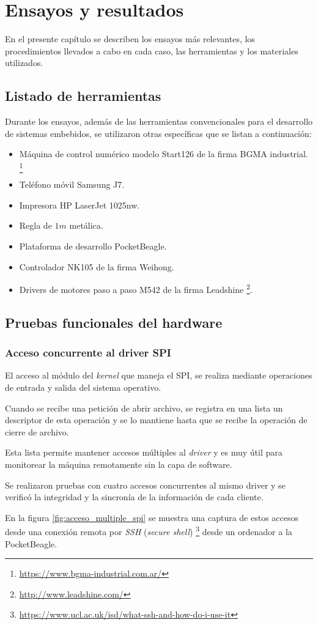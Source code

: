 \chapter{Ensayos y resultados} %
\label{Chapter4}

En el presente capítulo se describen los ensayos más relevantes, los procedimientos llevados a cabo en cada caso, las herramientas y los materiales utilizados.

\section{Listado de herramientas}

Durante los ensayos, además de las herramientas convencionales para el desarrollo de sistemas embebidos, se utilizaron otras específicas que se listan a continuación:
\begin{itemize}
   \item{Máquina de control numérico modelo Start126 de la firma BGMA industrial. \footnote{\url{https://www.bgma-industrial.com.ar/}}}
   \item{Teléfono móvil Samsung J7.}
   \item{Impresora HP LaserJet 1025nw.}
   \item{Regla de $1m$ metálica.}
   \item{Plataforma de desarrollo PocketBeagle.}
   \item{Controlador NK105 de la firma Weihong.}
   \item{Drivers de motores paso a paso M542 de la firma Leadshine \footnote{\url{http://www.leadshine.com/}}.}
\end{itemize}

\section{Pruebas funcionales del hardware}
\label{sec:pruebasHW}

\subsection{Acceso concurrente al driver SPI}
El acceso al módulo del \textit{kernel} que maneja el SPI, se realiza mediante operaciones de entrada y salida del sistema operativo.\par
Cuando se recibe una petición de abrir archivo, se registra en una lista un descriptor de esta operación y se lo mantiene hasta que se recibe la operación de cierre de archivo. \par
Esta lista permite mantener accesos múltiples al \textit{driver} y es muy útil para monitorear la máquina remotamente sin la capa de software.\par
Se realizaron pruebas con cuatro accesos concurrentes al mismo driver y se verificó la integridad y la sincronía de la información de cada cliente.\par
En la figura \ref{fig:acceso_multiple_spi} se muestra una captura de estos accesos desde una conexión remota por \textit{SSH} (\textit{secure shell}) \footnote{\url{https://www.ucl.ac.uk/isd/what-ssh-and-how-do-i-use-it}} desde un ordenador a la PocketBeagle.

